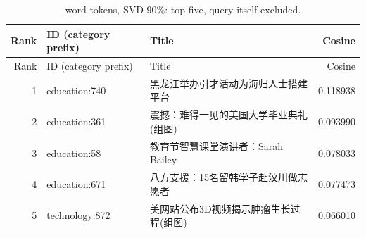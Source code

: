 {\small\renewcommand{\arraystretch}{1.05}
\begin{longtable}{rp{}p{}r}
\caption{word tokens, SVD 90\%: top five, query itself excluded.}\\
\toprule
Rank & ID (category prefix) & Title & Cosine \\ \midrule\endfirsthead
\toprule
Rank & ID (category prefix) & Title & Cosine \\ \midrule\endhead
1 & education:740 & 黑龙江举办引才活动为海归人士搭建平台 & 0.118938 \\
2 & education:361 & 震撼：难得一见的美国大学毕业典礼(组图) & 0.093990 \\
3 & education:58 & 教育节智慧课堂演讲者：Sarah Bailey & 0.078033 \\
4 & education:671 & 八方支援：15名留韩学子赴汶川做志愿者 & 0.077473 \\
5 & technology:872 & 美网站公布3D视频揭示肿瘤生长过程(组图) & 0.066010 \\
\bottomrule
\end{longtable}
}
